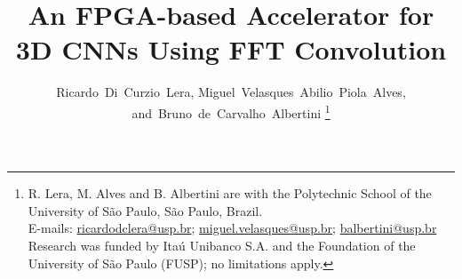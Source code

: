 \documentclass[10pt,peerreview,compsoc]{IEEEtran}
\begin{document}
\title{An FPGA-based Accelerator for 3D CNNs Using FFT Convolution}
\author{
  Ricardo~Di~Curzio~Lera, 
  Miguel~Velasques~Abilio~Piola~Alves,
  and~Bruno~de~Carvalho~Albertini%
  \thanks{%
    R. Lera, M. Alves and B. Albertini are with the Polytechnic School of the University of São Paulo, São Paulo, Brazil.\protect\\
    E-mails: \href{mailto:ricardodclera@usp.br}{ricardodclera@usp.br}; \href{mailto:me@somewhere.com}{miguel.velasques@usp.br}; \href{mailto:me@somewhere.com}{balbertini@usp.br}\protect\\
    Research was funded by Itaú Unibanco S.A. and the Foundation of the University of São Paulo (FUSP); no limitations apply.%
  }%
}
% 
\maketitle
\IEEEdisplaynontitleabstractindextext
\end{document}
